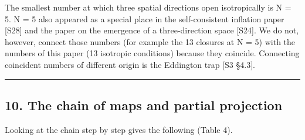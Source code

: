 \documentclass[
  a4paper,
]{article}
\begin{document}
The smallest number at which three spatial directions open isotropically
is N = 5. N = 5 also appeared as a special place in the self-consistent
inflation paper {[}S28{]} and the paper on the emergence of a
three-direction space {[}S24{]}. We do not, however, connect those
numbers (for example the 13 closures at N = 5) with the numbers of this
paper (13 isotropic conditions) because they coincide. Connecting
coincident numbers of different origin is the Eddington trap {[}S3
§4.3{]}.

\begin{center}\rule{0.5\linewidth}{0.5pt}\end{center}

\subsection{10. The chain of maps and partial
projection}\label{the-chain-of-maps-and-partial-projection}

Looking at the chain step by step gives the following (Table 4).
\end{document}
